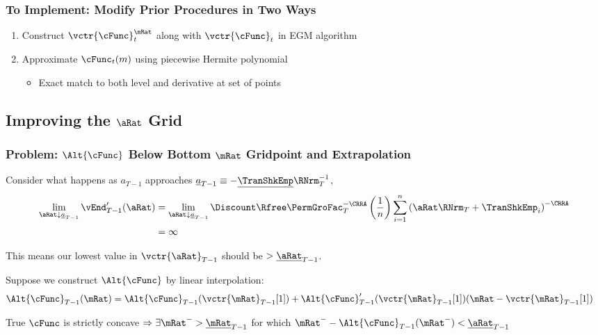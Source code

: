 \documentclass{beamer}
\begin{document}
\begin{frame}
\frametitle{To Implement: Modify Prior Procedures in Two Ways}
\begin{enumerate}
\item Construct $\vctr{\cFunc}^{\mRat}_{t}$ along with $\vctr{\cFunc}_{t}$ in EGM algorithm
\item Approximate $\cFunc_{t}(m)$ using piecewise Hermite polynomial
\begin{itemize}
\item Exact match to both level and derivative at set of points
\end{itemize}
\end{enumerate}
\end{frame}


\subsection{Improving the $\aRat$ Grid}

\begin{frame}
\frametitle{Problem: $\Alt{\cFunc}$ Below Bottom $\mRat$ Gridpoint and Extrapolation}

Consider what happens as ${a}_{T-1}$ approaches $\underline{a}_{T-1}\equiv-\underline{\TranShkEmp}\RNrm_{T}^{-1}$,
\begin{equation*}\begin{gathered}\begin{aligned}
        \lim_{{\aRat} \downarrow \underline{a}_{T-1}} \vEnd_{T-1}^{\prime}({\aRat}) 
& =         \lim_{{\aRat} \downarrow \underline{a}_{T-1}} \Discount \Rfree \PermGroFac_{T}^{-\CRRA} \left(\frac{1}{n}\right) \sum_{i=1}^{n} \left( {\aRat} \RNrm_{T}+ \TranShkEmp_{i}\right)^{-\CRRA}
\\  & = \infty
\end{aligned}\end{gathered}\end{equation*}

This means our lowest value in $\vctr{\aRat}_{T-1}$ should be $> \underline{\aRat}_{T-1}$.  

\medskip
Suppose we construct $\Alt{\cFunc}$ by linear interpolation:
\begin{equation*}\begin{gathered}\begin{aligned}
  \Alt{\cFunc}_{T-1}(\mRat)  & = \Alt{\cFunc}_{T-1}(\vctr{\mRat}_{T-1}[1])+\Alt{\cFunc}_{T-1}^{\prime}(\vctr{\mRat}_{T-1}[1])({\mRat}-\vctr{\mRat}_{T-1}[1]) \label{eq:ExtrapLin}
\end{aligned}\end{gathered}\end{equation*}

True $\cFunc$ is strictly concave 
$\Rightarrow \exists \mRat^{-} > \underline{\mRat}_{T-1}$  for which $\mRat^{-}-\Alt{\cFunc}_{T-1}(\mRat^{-}) < \underline{\aRat}_{T-1}$

\end{frame}
\end{document}
